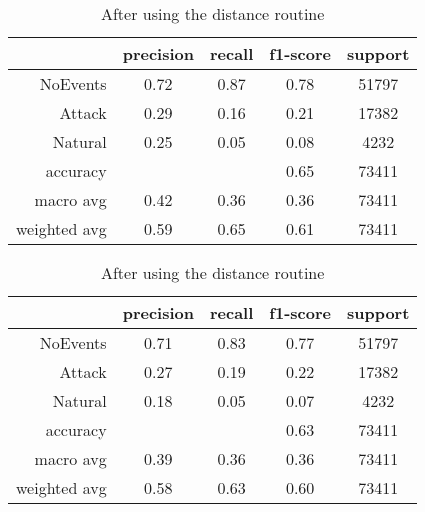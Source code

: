 \begin{table}[H]
    \centering \footnotesize
    \caption{Distance routine results for Random Forest classifier}  \label{tab:dist_rf}
    \begin{subtable}[t]{.5\linewidth}
        \centering
        \caption{Before using the distance routine} 
        \begin{tabular}{rcccc}\toprule
            & precision    &recall & f1-score  & support \\\midrule
            NoEvents   &    0.72  &    0.87 &     0.78 &  51797 \\
            Attack     &  0.29    &  0.16   &   0.21   &  17382 \\
           Natural     &  0.25    &  0.05   &   0.08   &   4232 \\
          accuracy     &          &         &   0.65   &  73411 \\
         macro avg     &  0.42    &  0.36   &   0.36   &  73411 \\
      weighted avg     &  0.59    &  0.65   &   0.61   &  73411 \\ \bottomrule
        \end{tabular}
    \end{subtable}%
    \begin{subtable}[t]{.5\linewidth}
        \centering
        \caption{After using the distance routine} 
        \begin{tabular}{rcccc}\toprule
         &   precision    &recall & f1-score &  support  \\\midrule
    
        NoEvents   &    0.71 &     0.83 &     0.77 &   51797\\
         Attack    &   0.27  &    0.19  &    0.22  &   17382\\
        Natural    &   0.18  &    0.05  &    0.07  &    4232\\
       accuracy    &         &          &    0.63  &   73411\\
      macro avg    &   0.39  &    0.36  &    0.36  &   73411\\
   weighted avg    &   0.58  &    0.63  &    0.60  &   73411\\  \bottomrule
        \end{tabular}
    \end{subtable}
\end{table}

